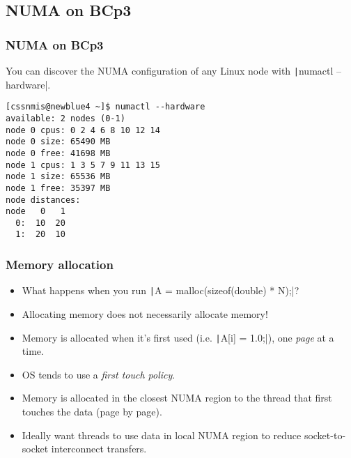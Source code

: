 \documentclass{beamer}
\begin{document}
\subsection{NUMA on BCp3}
\begin{frame}[fragile]
\frametitle{NUMA on BCp3}
You can discover the NUMA configuration of any Linux node with \texttt|numactl --hardware|.


\begin{verbatim}
[cssnmis@newblue4 ~]$ numactl --hardware
available: 2 nodes (0-1)
node 0 cpus: 0 2 4 6 8 10 12 14
node 0 size: 65490 MB
node 0 free: 41698 MB
node 1 cpus: 1 3 5 7 9 11 13 15
node 1 size: 65536 MB
node 1 free: 35397 MB
node distances:
node   0   1 
  0:  10  20 
  1:  20  10 
\end{verbatim}

\end{frame}



\begin{frame}
\frametitle{Memory allocation}
\begin{itemize}
  \item What happens when you run \texttt|A = malloc(sizeof(double) * N);|?
  \pause
  \item Allocating memory does not necessarily allocate memory!
  \item Memory is allocated when it's first used (i.e. \texttt|A[i] = 1.0;|), one \emph{page} at a time.
  \item OS tends to use a \emph{first touch policy}.
  \item Memory is allocated in the closest NUMA region to the thread that first touches the data (page by page).
  \item Ideally want threads to use data in local NUMA region to reduce socket-to-socket interconnect transfers.
\end{itemize}
\end{frame}

\end{document}
